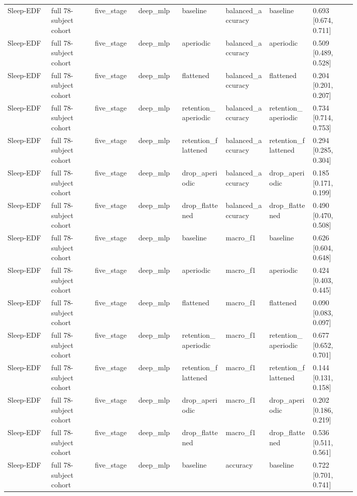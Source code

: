 \begin{longtable}{p{0.10\linewidth}p{0.10\linewidth}p{0.10\linewidth}p{0.10\linewidth}p{0.10\linewidth}p{0.10\linewidth}p{0.10\linewidth}p{0.10\linewidth}}
Sleep-EDF & full 78-subject cohort & five\_stage & deep\_mlp & baseline & balanced\_accuracy & baseline & 0.693 [0.674, 0.711]\\
Sleep-EDF & full 78-subject cohort & five\_stage & deep\_mlp & aperiodic & balanced\_accuracy & aperiodic & 0.509 [0.489, 0.528]\\
Sleep-EDF & full 78-subject cohort & five\_stage & deep\_mlp & flattened & balanced\_accuracy & flattened & 0.204 [0.201, 0.207]\\
Sleep-EDF & full 78-subject cohort & five\_stage & deep\_mlp & retention\_aperiodic & balanced\_accuracy & retention\_aperiodic & 0.734 [0.714, 0.753]\\
Sleep-EDF & full 78-subject cohort & five\_stage & deep\_mlp & retention\_flattened & balanced\_accuracy & retention\_flattened & 0.294 [0.285, 0.304]\\
Sleep-EDF & full 78-subject cohort & five\_stage & deep\_mlp & drop\_aperiodic & balanced\_accuracy & drop\_aperiodic & 0.185 [0.171, 0.199]\\
Sleep-EDF & full 78-subject cohort & five\_stage & deep\_mlp & drop\_flattened & balanced\_accuracy & drop\_flattened & 0.490 [0.470, 0.508]\\
Sleep-EDF & full 78-subject cohort & five\_stage & deep\_mlp & baseline & macro\_f1 & baseline & 0.626 [0.604, 0.648]\\
Sleep-EDF & full 78-subject cohort & five\_stage & deep\_mlp & aperiodic & macro\_f1 & aperiodic & 0.424 [0.403, 0.445]\\
Sleep-EDF & full 78-subject cohort & five\_stage & deep\_mlp & flattened & macro\_f1 & flattened & 0.090 [0.083, 0.097]\\
Sleep-EDF & full 78-subject cohort & five\_stage & deep\_mlp & retention\_aperiodic & macro\_f1 & retention\_aperiodic & 0.677 [0.652, 0.701]\\
Sleep-EDF & full 78-subject cohort & five\_stage & deep\_mlp & retention\_flattened & macro\_f1 & retention\_flattened & 0.144 [0.131, 0.158]\\
Sleep-EDF & full 78-subject cohort & five\_stage & deep\_mlp & drop\_aperiodic & macro\_f1 & drop\_aperiodic & 0.202 [0.186, 0.219]\\
Sleep-EDF & full 78-subject cohort & five\_stage & deep\_mlp & drop\_flattened & macro\_f1 & drop\_flattened & 0.536 [0.511, 0.561]\\
Sleep-EDF & full 78-subject cohort & five\_stage & deep\_mlp & baseline & accuracy & baseline & 0.722 [0.701, 0.741]\\

\end{longtable}
